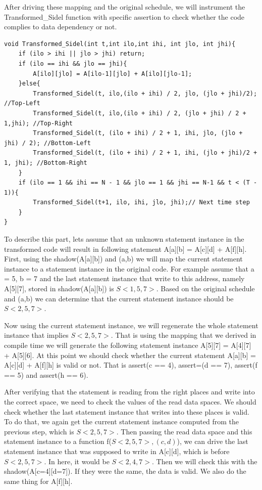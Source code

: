 \documentclass[letterpaper,12pt]{article}
\begin{document}
    	 After driving these mapping and the original schedule, we will instrument the Transformed\_Sidel function with specific assertion to check whether the code complies to data dependency or not.
    \begin{lstlisting}[caption={The transformed code}, label={code:transformed}, captionpos=b]
void Transformed_Sidel(int t,int ilo,int ihi, int jlo, int jhi){
	if (ilo > ihi || jlo > jhi) return;
	if (ilo == ihi && jlo == jhi){
		A[ilo][jlo] = A[ilo-1][jlo] + A[ilo][jlo-1];
	}else{
		Transformed_Sidel(t, ilo,(ilo + ihi) / 2, jlo, (jlo + jhi)/2); //Top-Left
		Transformed_Sidel(t, ilo,(ilo + ihi) / 2, (jlo + jhi) / 2 + 1,jhi); //Top-Right
		Transformed_Sidel(t, (ilo + ihi) / 2 + 1, ihi, jlo, (jlo + jhi) / 2); //Bottom-Left
		Transformed_Sidel(t, (ilo + ihi) / 2 + 1, ihi, (jlo + jhi)/2 + 1, jhi); //Bottom-Right
	}
	if (ilo == 1 && ihi == N - 1 && jlo == 1 && jhi == N-1 && t < (T - 1)){
		Transformed_Sidel(t+1, ilo, ihi, jlo, jhi);// Next time step
	}
}
    \end{lstlisting}
    
    To describe this part, lets assume that an unknown statement instance in the transformed code will result in following statement A[a][b] = A[c][d] + A[f][h]. First, using the shadow(A[a][b]) and (a,b) we will map the current statement instance to a statement instance in the original code. For example assume that a = 5, b = 7 and the last statement instance that write to this address, namely A[5][7], stored in shadow(A[a][b]) is $S<1,5,7>$. Based on the original schedule and (a,b) we can determine that the current statement instance should be $S<2,5,7>$. 
  
  Now using the current statement instance, we will regenerate the whole statement instance that implies $S<2,5,7>$. That is using the mapping that we derived in compile time we will generate the following statement instance A[5][7] = A[4][7] + A[5][6]. At this point we should check whether the current statement A[a][b] = A[c][d] + A[f][h] is valid or not. That is assert(c == 4), assert=(d == 7), assert(f == 5) and assert(h == 6).
  
  After verifying that the statement is reading from the right places and write into the correct space, we need to check the values of the read data spaces. We should check whether the last statement instance that writes into these places is valid. To do that, we again get the current statement instance computed from the previous step, which is $S<2,5,7>$. Then passing the read data space and this statement instance to a function f($S<2,5,7>, (c,d)$), we can drive the last statement instance that was supposed to write in A[c][d], which is before $S<2,5,7>$. In here, it would be $S<2,4,7>$. Then we will check this with the shadow(A[c=4][d=7]). If they were the same, the data is valid. We also do the same thing for A[f][h]. 
  
\end{document}
